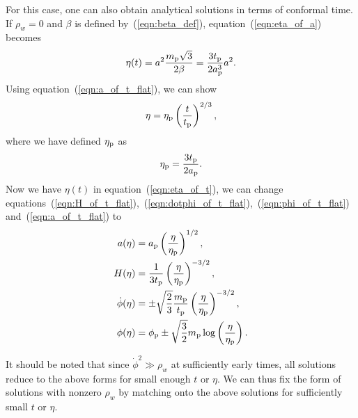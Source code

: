 For this case, one can also obtain analytical solutions in terms of conformal time.  If $\rho_w=0$ and $\beta$ is defined by~(\ref{eqn:beta_def}), equation~(\ref{eqn:eta_of_a}) becomes
%
\begin{equation}
  \eta(t) 
  = 
  a^2 \frac{m_{\mathrm{p}}\sqrt{3}}{2\beta}
  =
  \frac{3t_{\mathrm{p}}}{2a_{\mathrm{p}}^3}a^2.
  \label{eqn:eta_of_t}
\end{equation}
%
Using equation~(\ref{eqn:a_of_t_flat}), we can show
%
\begin{equation}
  \eta
  =
  \eta_{\mathrm{p}}\left(\frac{t}{t_{\mathrm{p}}}\right)^{2/3},
\end{equation}
%
where we have defined $\eta_{\mathrm{p}}$ as
%
\begin{equation}
  \eta_{\mathrm{p}}
  =
  \frac{3t_{\mathrm{p}}}{2a_{\mathrm{p}}}.
  \label{eqn:etap_eq}
\end{equation}
%
Now we have $\eta(t)$ in equation~(\ref{eqn:eta_of_t}), we can change equations~(\ref{eqn:H_of_t_flat}),~(\ref{eqn:dotphi_of_t_flat}),~(\ref{eqn:phi_of_t_flat}) and~(\ref{eqn:a_of_t_flat}) to
%
\begin{align}
  a(\eta)
  &=
  a_{\mathrm{p}} \left(\frac{\eta}{\eta_{\mathrm{p}}}\right)^{1/2},
  \\
  H(\eta)
  &=
  \frac{1}{3t_{\mathrm{p}}}\left(\frac{\eta}{\eta_{\mathrm{p}}}\right)^{-3/2},
  \\
  \dot{\phi}(\eta)
  &=
  \pm\sqrt{\frac{2}{3}}
  \frac{m_{\mathrm{p}}}{t_{\mathrm{p}}}\left(\frac{\eta}{\eta_{\mathrm{p}}}\right)^{-3/2},
  \\
  \phi(\eta)
  &=
  \phi_{\mathrm{p}} \pm\sqrt{\frac{3}{2}}m_{\mathrm{p}}\log\left(\frac{\eta}{\eta_{\mathrm{p}}}\right). 
  \label{eqn:phi_flat}
\end{align}
%

It should be noted that since $\dot{\phi}^2 \gg \rho_w$ at sufficiently early times, all solutions reduce to the above forms for small enough $t$ or $\eta$. We can thus fix the form of solutions with nonzero $\rho_w$ by matching onto the above solutions for sufficiently small $t$ or $\eta$.  

